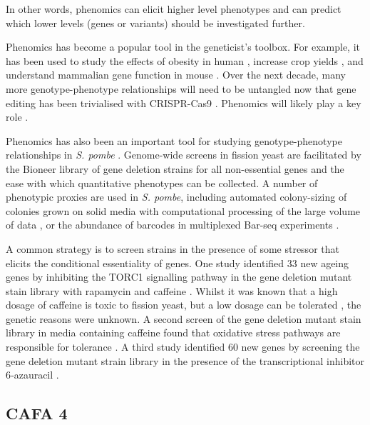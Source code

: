 In other words, phenomics can elicit higher level phenotypes and can predict which lower levels (genes or variants) should be investigated further.

Phenomics has become a popular tool in the geneticist's toolbox. For example, it has been used to study the effects of obesity in human \cite{Hoyles2018}, increase crop yields \cite{Zhao2019,Watt2020}, and understand mammalian gene function in mouse \cite{Brown2018a}. Over the next decade, many more genotype-phenotype relationships will need to be untangled now that gene editing has been trivialised with CRISPR-Cas9 \cite{Mali2013a,Cong2013}. Phenomics will likely play a key role \cite{Gerlai2002}.

Phenomics has also been an important tool for studying genotype-phenotype relationships in \emph{S. pombe} \cite{Rallis2016}. Genome-wide screens in fission yeast are facilitated by the Bioneer library of gene deletion strains for all non-essential genes \cite{Kim2010} and the ease with which quantitative phenotypes can be collected. A number of phenotypic proxies are used in \emph{S. pombe}, including automated colony-sizing of colonies grown on solid media with computational processing of the large volume of data \cite{Bischof2016,Zackrisson2016,Kamrad2020,Sailem2020}, or the abundance of barcodes in multiplexed Bar-seq experiments \cite{Smith2009,Romila2019}.

A common strategy is to screen strains in the presence of some stressor that elicits the conditional essentiality of genes. One study identified $33$ new ageing genes by inhibiting the TORC1 signalling pathway in the gene deletion mutant stain library with rapamycin and caffeine \cite{Rallis2014a}. Whilst it was known that a high dosage of caffeine is toxic to fission yeast, but a low dosage can be tolerated \cite{Gentner1975,Osman1998}, the genetic reasons were unknown. A second screen of the gene deletion mutant stain library in media containing caffeine found that oxidative stress pathways are responsible for tolerance \cite{Calvo2009}. A third study identified $60$ new genes by screening the gene deletion mutant strain library in the presence of the transcriptional inhibitor 6‐azauracil \cite{Zhou2015a}.

\subsection{CAFA 4}

